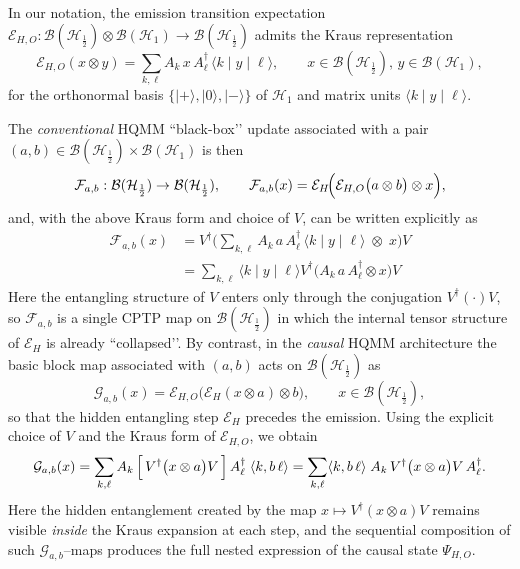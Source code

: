 \documentclass[11pt,a4paper]{article}
\begin{document}
In our notation, the emission transition expectation
\(
\mathcal{E}_{H,O}:\mathcal{B}(\mathcal{H}_{\frac{1}{2}})\otimes\mathcal{B}(\mathcal{H}_{1})\to\mathcal{B}(\mathcal{H}_{\frac{1}{2}})
\)
admits the Kraus representation
\[
\mathcal{E}_{H,O}(x\otimes y)
=
\sum_{k,\ell} A_k\, x\, A_\ell^\dagger\,\langle k\mid y\mid\ell\rangle,
\qquad x\in\mathcal{B}(\mathcal{H}_{\frac{1}{2}}),\,y\in\mathcal{B}(\mathcal{H}_{1}),
\]
for the orthonormal basis  $\{|+\rangle,|0\rangle,|-\rangle\}$  of $\mathcal{H}_{1}$ and matrix units $\langle k\mid y\mid\ell\rangle$.

The \emph{conventional} HQMM “black-box’’ update associated with a pair $(a,b)\in\mathcal{B}(\mathcal{H}_{\frac{1}{2}})\times\mathcal{B}(\mathcal{H}_{1})$ is then
\[
\mathcal{F}_{a,b} : \mathcal{B}(\mathcal{H}_{\frac{1}{2}})\to\mathcal{B}(\mathcal{H}_{\frac{1}{2}}),
\qquad
\mathcal{F}_{a,b}(x)
=
\mathcal{E}_{H}\!\Bigl(
  \mathcal{E}_{H,O}\bigl(a\otimes b\bigr)
  \otimes x
\Bigr),
\]
and, with the above Kraus form and choice of $V$, can be written explicitly as
\begin{align*}
\mathcal{F}_{a,b}(x)
&=
V^\dagger\!\Biggl(
  \sum_{k,\ell} A_k\, a\, A_\ell^\dagger\,\langle k\mid y\mid\ell\rangle
  \;\otimes\; x
\Biggr)V\\
&=
\sum_{k,\ell}
\langle k\mid y\mid\ell\rangle
V^\dagger\bigl(A_k\, a\, A_\ell^\dagger\otimes x\bigr)V
\end{align*}
Here the entangling structure of $V$ enters only through the conjugation $V^\dagger(\cdot)V$, so $\mathcal{F}_{a,b}$ is a single CPTP map on $\mathcal{B}(\mathcal{H}_{\frac{1}{2}})$ in which the internal tensor structure of $\mathcal{E}_{H}$ is already “collapsed’’. By contrast, in the \emph{causal} HQMM architecture the basic block map associated with $(a,b)$ acts on $\mathcal{B}(\mathcal{H}_{\frac{1}{2}})$ as
\[
\mathcal{G}_{a,b}(x)
=
\mathcal{E}_{H,O}\bigl(\mathcal{E}_{H}(x\otimes a)\otimes b\bigr),
\qquad x\in\mathcal{B}(\mathcal{H}_{\frac{1}{2}}),
\]
so that the hidden entangling step \(\mathcal{E}_{H}\) precedes the emission. Using the explicit choice of $V$ and the Kraus form of $\mathcal{E}_{H,O}$, we obtain
\[
\mathcal{G}_{a,b}(x)
=
\sum_{k,\ell}
A_k\,
\Bigl[\,V^\dagger\bigl(x\otimes a\bigr)V\,\Bigr]\,
A_\ell^\dagger\;\langle k,b\,\ell\rangle
=
\sum_{k,\ell}
\langle k,b\,\ell\rangle\;
A_k\,V^\dagger\bigl(x\otimes a\bigr)V\,A_\ell^\dagger.
\]
Here the hidden entanglement created by the map $x\mapsto V^\dagger(x\otimes a)V$ remains visible \emph{inside} the Kraus expansion at each step, and the sequential composition of such $\mathcal{G}_{a,b}$–maps produces the full nested expression of the causal state $\Psi_{H,O}$.
\end{document}
